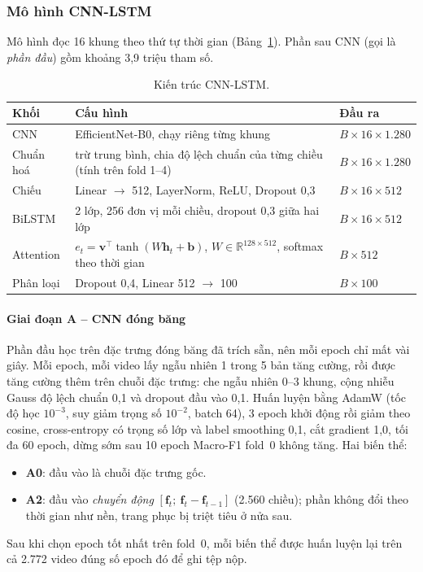 \subsubsection{Mô hình CNN-LSTM}
\label{subsec:cnnlstm_design}

Mô hình đọc 16 khung theo thứ tự thời gian (Bảng~\ref{tab:cnnlstm_arch}). Phần sau CNN (gọi là \emph{phần đầu}) gồm khoảng 3,9 triệu tham số.

\begin{table}[H]
  \centering
  \caption{Kiến trúc CNN-LSTM.}
  \label{tab:cnnlstm_arch}
  \small
  \begin{tabular}{@{}p{}p{}p{}@{}}
    \toprule
    \textbf{Khối} & \textbf{Cấu hình} & \textbf{Đầu ra} \\
    \midrule
    CNN & EfficientNet-B0, chạy riêng từng khung & $B\times16\times1.280$ \\
    Chuẩn hoá & trừ trung bình, chia độ lệch chuẩn của từng chiều (tính trên fold 1--4) & $B\times16\times1.280$ \\
    Chiếu & Linear $\rightarrow$ 512, LayerNorm, ReLU, Dropout 0,3 & $B\times16\times512$ \\
    BiLSTM & 2 lớp, 256 đơn vị mỗi chiều, dropout 0,3 giữa hai lớp & $B\times16\times512$ \\
    Attention & $e_t=\mathbf{v}^\top\tanh(W\mathbf{h}_t+\mathbf{b})$, $W\in\mathbb{R}^{128\times512}$, softmax theo thời gian & $B\times512$ \\
    Phân loại & Dropout 0,4, Linear 512 $\rightarrow$ 100 & $B\times100$ \\
    \bottomrule
  \end{tabular}
\end{table}

\paragraph*{Giai đoạn A -- CNN đóng băng} Phần đầu học trên đặc trưng đóng băng đã trích sẵn, nên mỗi epoch chỉ mất vài giây. Mỗi epoch, mỗi video lấy ngẫu nhiên 1 trong 5 bản tăng cường, rồi được tăng cường thêm trên chuỗi đặc trưng: che ngẫu nhiên 0--3 khung, cộng nhiễu Gauss độ lệch chuẩn 0,1 và dropout đầu vào 0,1. Huấn luyện bằng AdamW (tốc độ học $10^{-3}$, suy giảm trọng số $10^{-2}$, batch 64), 3 epoch khởi động rồi giảm theo cosine, cross-entropy có trọng số lớp và label smoothing 0,1, cắt gradient 1,0, tối đa 60 epoch, dừng sớm sau 10 epoch Macro-F1 fold~0 không tăng. Hai biến thể:
\begin{itemize}
  \item \textbf{A0}: đầu vào là chuỗi đặc trưng gốc.
  \item \textbf{A2}: đầu vào \emph{chuyển động} $[\mathbf{f}_t;\ \mathbf{f}_t-\mathbf{f}_{t-1}]$ (2.560 chiều); phần không đổi theo thời gian như nền, trang phục bị triệt tiêu ở nửa sau.
\end{itemize}
Sau khi chọn epoch tốt nhất trên fold~0, mỗi biến thể được huấn luyện lại trên cả 2.772 video đúng số epoch đó để ghi tệp nộp.

